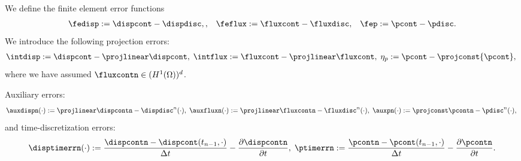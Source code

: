 We define the finite element error functions
\begin{eqnarray*}
\fedisp :=\dispcont - \dispdisc, ,\; \; \;  \feflux:=\fluxcont - \fluxdisc, \;\; \;  \fep:={\pcont} - {\pdisc}.
\label{eqn:int_def}
\end{eqnarray*}
We introduce the following projection errors:
\begin{eqnarray*}
\intdisp:=\dispcont - \projlinear\dispcont, \; \intflux :=\fluxcont - \projlinear \fluxcont,\; \eta_p :={\pcont} - \projconst{\pcont},\; 
\label{eqn:int_def}
\end{eqnarray*}
where we have assumed $\fluxcontn \in (H^1(\Omega))^d$.

Auxiliary errors:
\begin{equation}
\auxdispn (\cdot ):=\projlinear\dispcontn-\dispdisc^{n} (\cdot ),\; \auxfluxn (\cdot ):=\projlinear\fluxcontn-\fluxdisc^{n} (\cdot ),\; \auxpn (\cdot ):= \projconst\pcontn-\pdisc^{n} (\cdot ),\; 
\label{eqn:aux_def}
\end{equation} 
and time-discretization errors:
\begin{equation}
\disptimerrn (\cdot ):= \frac{\dispcontn-\dispcont(t_{n-1},\cdot)}{\Delta t}  - \frac{ \partial \dispcontn }{\partial t},\;
\ptimerrn:= \frac{\pcontn-\pcont(t_{n-1},\cdot)}{\Delta t}  - \frac{ \partial \pcontn }{\partial t}.
\end{equation}

